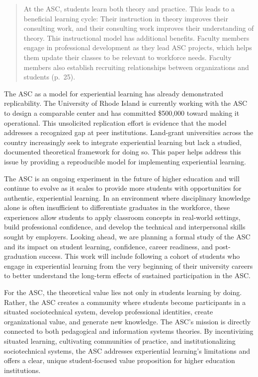 \documentclass[
  12pt]{article}
\begin{document}
\begin{quote}
At the ASC, students learn both theory and practice. This leads to a
beneficial learning cycle: Their instruction in theory improves their
consulting work, and their consulting work improves their understanding
of theory. This instructional model has additional benefits. Faculty
members engage in professional development as they lead ASC projects,
which helps them update their classes to be relevant to workforce needs.
Faculty members also establish recruiting relationships between
organizations and students (p.~25).
\end{quote}

The ASC as a model for experiential learning has already demonstrated
replicability. The University of Rhode Island is currently working with
the ASC to design a comparable center and has committed \$500,000 toward
making it operational. This unsolicited replication effort is evidence
that the model addresses a recognized gap at peer institutions.
Land-grant universities across the country increasingly seek to
integrate experiential learning but lack a studied, documented
theoretical framework for doing so. This paper helps address this issue
by providing a reproducible model for implementing experiential
learning.

The ASC is an ongoing experiment in the future of higher education and
will continue to evolve as it scales to provide more students with
opportunities for authentic, experiential learning. In an environment
where disciplinary knowledge alone is often insufficient to
differentiate graduates in the workforce, these experiences allow
students to apply classroom concepts in real-world settings, build
professional confidence, and develop the technical and interpersonal
skills sought by employers. Looking ahead, we are planning a formal
study of the ASC and its impact on student learning, confidence, career
readiness, and post-graduation success. This work will include following
a cohort of students who engage in experiential learning from the very
beginning of their university careers to better understand the long-term
effects of sustained participation in the ASC.

For the ASC, the theoretical value lies not only in students learning by
doing. Rather, the ASC creates a community where students become
participants in a situated sociotechnical system, develop professional
identities, create organizational value, and generate new knowledge. The
ASC's mission is directly connected to both pedagogical and information
systems theories. By incentivizing situated learning, cultivating
communities of practice, and institutionalizing sociotechnical systems,
the ASC addresses experiential learning's limitations and offers a
clear, unique student-focused value proposition for higher education
institutions.
\end{document}

